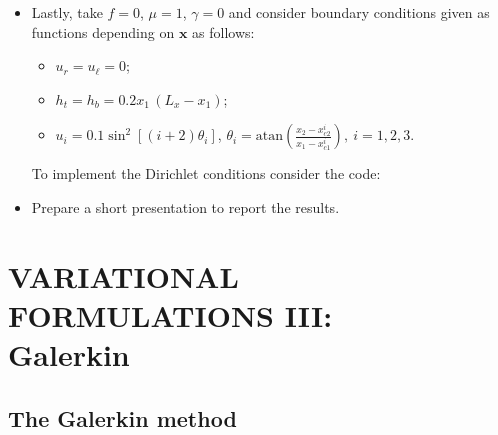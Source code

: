 \begin{kaobox}[frametitle=Implement the following modifications to \texttt{variants\_poisson.py}]
\begin{itemize}
\item Lastly, take $f = 0$, $\mu = 1$, $\gamma = 0$ and
consider boundary conditions given as functions depending on $\mathbf{x}$ as follows:

\begin{itemize}
\item $u_r = u_{\ell} = 0$;
\item $h_t = h_b = 0.2 x_1\,(L_x - x_1)$;
\item $u_i = 0.1\sin^2[(i+2)\theta_i]$, $\theta_i = \mbox{atan}\left (\frac{x_2-x_{c2}^i}{x_1-x_{c1}^i} \right),~i=1,2,3$. 
\end{itemize}
To implement the Dirichlet conditions consider the code:
\begin{center}
\begin{minipage}{0.75\textwidth}
    
\end{minipage}
\end{center}


\item Prepare a short presentation to report the results.

\end{itemize}

\end{kaobox}



\setchapterpreamble[u]{\margintoc}
\chapter{VARIATIONAL FORMULATIONS III:\\Galerkin}

\section{The Galerkin method}  \label{galerkinmethod}

